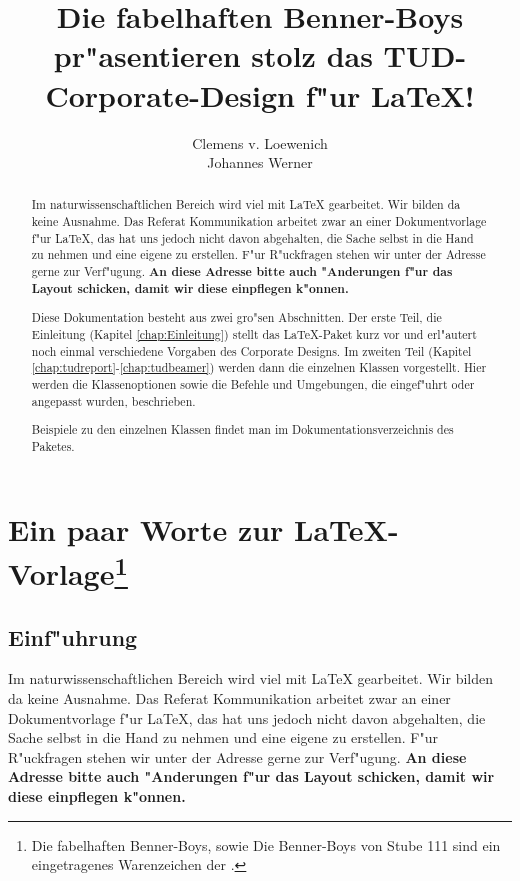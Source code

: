 \documentclass[twoside,colorback,accentcolor=tud4c,11pt]{tudreport}
\title{Die fabelhaften Benner-Boys pr"asentieren
  stolz das TUD-\\Corporate-Design f"ur {\LaTeX}!}
\subtitle{Clemens v. Loewenich\\Johannes Werner}
\begin{document}
\maketitle
\begin{abstract}
   Im naturwissenschaftlichen Bereich wird viel mit {\LaTeX} gearbeitet. Wir bilden
   da keine Ausnahme. Das Referat Kommunikation arbeitet zwar an einer Dokumentvorlage f"ur
   {\LaTeX}, das hat uns jedoch nicht davon abgehalten, die Sache selbst in die Hand zu nehmen und
   eine eigene  zu erstellen.
   F"ur R"uckfragen stehen wir unter der Adresse 
   gerne zur Verf"ugung. \textbf{An diese Adresse bitte auch "Anderungen f"ur das Layout
   schicken, damit wir diese einpflegen k"onnen.}

   Diese Dokumentation besteht aus zwei gro"sen Abschnitten. Der erste Teil,
   die Einleitung (Kapitel \ref{chap:Einleitung}) stellt das {\LaTeX}-Paket kurz vor und
   erl"autert noch einmal verschiedene Vorgaben des Corporate Designs. Im
   zweiten Teil (Kapitel \ref{chap:tudreport}-\ref{chap:tudbeamer}) werden dann die
   einzelnen Klassen vorgestellt. Hier werden die Klassenoptionen sowie die
   Befehle und Umgebungen, die eingef"uhrt oder angepasst wurden, beschrieben.
   
   Beispiele zu den einzelnen Klassen findet man im Dokumentationsverzeichnis
   des Paketes.

\end{abstract}  

\tableofcontents

\chapter{\texorpdfstring{Ein paar Worte zur \LaTeX{}-Vorlage\footnote[1]{\glqq Die fabelhaften 
       Benner-Boys\grqq, sowie \glqq Die Benner-Boys von Stube 111\grqq{} sind ein eingetragenes
       Warenzeichen der .}}{Ein paar Worte zur
       \LaTeX{}-Vorlage}}\label{chap:Einleitung}
  
  \section{Einf"uhrung}
   Im naturwissenschaftlichen Bereich wird viel mit {\LaTeX} gearbeitet. Wir bilden 
   da keine Ausnahme. Das Referat Kommunikation arbeitet zwar an einer Dokumentvorlage f"ur
   {\LaTeX}, das hat uns jedoch nicht davon abgehalten, die Sache selbst in die Hand zu nehmen und
   eine eigene  zu erstellen.
   F"ur R"uckfragen stehen wir unter der Adresse 
   gerne zur Verf"ugung. \textbf{An diese Adresse bitte auch "Anderungen f"ur das Layout
   schicken, damit wir diese einpflegen k"onnen.}
\end{document}
